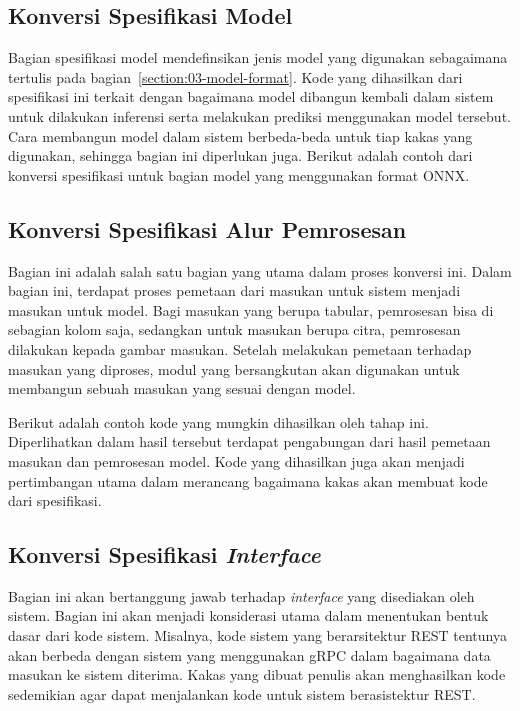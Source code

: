 
\subsection{Konversi Spesifikasi Model}

Bagian spesifikasi model mendefinsikan jenis model yang digunakan sebagaimana tertulis pada bagian~\ref{section:03-model-format}.
Kode yang dihasilkan dari spesifikasi ini terkait dengan bagaimana model dibangun kembali dalam sistem untuk dilakukan inferensi serta melakukan prediksi menggunakan model tersebut.
Cara membangun model dalam sistem berbeda-beda untuk tiap kakas yang digunakan, sehingga bagian ini diperlukan juga.
Berikut adalah contoh dari konversi spesifikasi untuk bagian model yang menggunakan format ONNX.


\subsection{Konversi Spesifikasi Alur Pemrosesan}

Bagian ini adalah salah satu bagian yang utama dalam proses konversi ini.
Dalam bagian ini, terdapat proses pemetaan dari masukan untuk sistem menjadi masukan untuk model.
Bagi masukan yang berupa tabular, pemrosesan bisa di sebagian kolom saja, sedangkan untuk masukan berupa citra, pemrosesan dilakukan kepada gambar masukan.
Setelah melakukan pemetaan terhadap masukan yang diproses, modul yang bersangkutan akan digunakan untuk membangun sebuah masukan yang sesuai dengan model.

Berikut adalah contoh kode yang mungkin dihasilkan oleh tahap ini.
Diperlihatkan dalam hasil tersebut terdapat pengabungan dari hasil pemetaan masukan dan pemrosesan model.
Kode yang dihasilkan juga akan menjadi pertimbangan utama dalam merancang bagaimana kakas akan membuat kode dari spesifikasi.


\subsection{Konversi Spesifikasi \textit{Interface}}

Bagian ini akan bertanggung jawab terhadap \textit{interface} yang disediakan oleh sistem.
Bagian ini akan menjadi konsiderasi utama dalam menentukan bentuk dasar dari kode sistem.
Misalnya, kode sistem yang berarsitektur REST tentunya akan berbeda dengan sistem yang menggunakan gRPC dalam bagaimana data masukan ke sistem diterima.
Kakas yang dibuat penulis akan menghasilkan kode sedemikian agar dapat menjalankan kode untuk sistem berasistektur REST.
